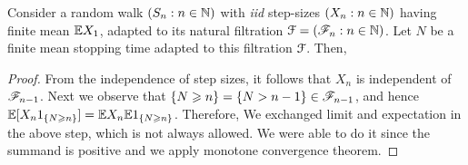 \documentclass[a4paper,10pt,english]{article}
\begin{document}
\begin{lem} 
Consider a random walk $(S_n: n \in \mathbb{N})$ with \emph{iid} step-sizes $(X_n: n \in \mathbb{N})$ having finite mean $\mathbb{E} X_1$, adapted to its natural filtration $\mathcal{F} = (\mathscr{F}_n: n \in \mathbb{N})$. 
Let $N$ be a finite mean stopping time adapted to this filtration $\mathcal{F}$. 
Then,
\end{lem}
\begin{proof} 
From the independence of step sizes, it follows that $X_n$ is independent of $\mathscr{F}_{n-1}$. 
Next we observe that $\{N \geqslant n\} = \{N > n-1\} \in \mathscr{F}_{n-1}$, 
and hence $\mathbb{E}[X_n1_{\{N \geqslant n\}}] = \mathbb{E} X_n \mathbb{E} 1_{\{N \geqslant n\}}$. 
Therefore,
We exchanged limit and expectation in the above step, which is not always allowed. 
We were able to do it since the summand is positive and we apply monotone convergence theorem. 
\end{proof}
\end{document}
